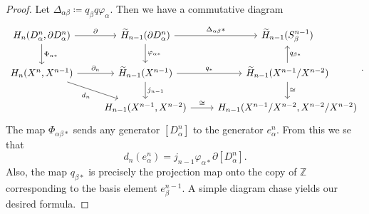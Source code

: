 \documentclass[10pt,letterpaper,cm]{nupset}
\theoremstyle{definition}
\theoremstyle{theorem}
\theoremstyle{remark}
\newcommand{\Z}{\mathbb Z}
\newcommand{\1}{\mathbb{1}}
\newcommand{\0}{\vec 0}
\begin{document}
\begin{proof}
Let $\Delta_{\alpha{\beta}}\coloneqq  q_{\beta}q \varphi_{\alpha}$. Then we have a commutative diagram
\[
\begin{tikzcd}
{H_n(D^n_{\alpha}, \partial{D_{\alpha}^n})} \arrow[d, "\Phi_{\alpha{\ast}}"] \arrow[r, "\partial"] & \widetilde{H}_{n-1}(\partial{D_{\alpha}^n}) \arrow[r, "\Delta_{\alpha{\beta}}{\ast}"] \arrow[d, "\varphi_{\alpha{\ast}}"] & \widetilde{H}_{n-1}(S_{\beta}^{n-1})                                                  \\
{H_n(X^n, X^{n-1})} \arrow[rd, "d_n"'] \arrow[r, "\partial_n"]                                     & \widetilde{H}_{n-1}(X^{n-1}) \arrow[r, "q_{\ast}"] \arrow[d, "j_{n-1}"]                                                   & \widetilde{H}_{n-1}(X^{n-1}/X^{n-2}) \arrow[u, "q_{\beta{\ast}}"'] \arrow[d, "\cong"] \\
                                                                                                   & {H_{n-1}(X^{n-1}, X^{n-2})} \arrow[r, "\cong"]                                                                            & {H_{n-1}(X^{n-1}/X^{n-2}, X^{n-2}/X^{n-2})}                                          
\end{tikzcd}
.\] The map $\Phi_{\alpha{\beta}{\ast}}$ sends any generator $\left[D_{\alpha}^n\right]$ to the generator $e_{\alpha}^n$. From this we se that $$  d_n(e_{\alpha}^n) = j_{n-1}\varphi_{\alpha{\ast}}\partial{[D_{\alpha}^n]}  .$$ Also, the map $q_{\beta{\ast}}$ is precisely the projection map onto the copy of $\Z$ corresponding to the basis element $e_{\beta}^{n-1}$. A simple diagram chase yields our desired formula. 
\end{proof}
\end{document}
